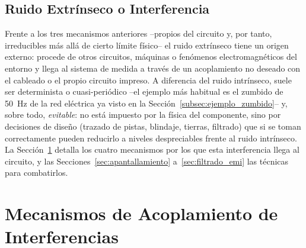 \subsection{Ruido Extrínseco o Interferencia}\label{sub:ruido_extrinseco}

Frente a los tres mecanismos anteriores --propios del circuito y, por tanto, irreducibles más allá de cierto límite físico-- el ruido extrínseco tiene un origen externo: procede de otros circuitos, máquinas o fenómenos electromagnéticos del entorno y llega al sistema de medida a través de un acoplamiento no deseado con el cableado o el propio circuito impreso. A diferencia del ruido intrínseco, suele ser determinista o cuasi-periódico --el ejemplo más habitual es el zumbido de \SI{50}{\hertz} de la red eléctrica ya visto en la Sección~\ref{subsec:ejemplo_zumbido}-- y, sobre todo, \emph{evitable}: no está impuesto por la física del componente, sino por decisiones de diseño (trazado de pistas, blindaje, tierras, filtrado) que si se toman correctamente pueden reducirlo a niveles despreciables frente al ruido intrínseco. La Sección~\ref{sec:acoplamientos} detalla los cuatro mecanismos por los que esta interferencia llega al circuito, y las Secciones~\ref{sec:apantallamiento} a~\ref{sec:filtrado_emi} las técnicas para combatirlos.


\section{Mecanismos de Acoplamiento de Interferencias}\label{sec:acoplamientos}


